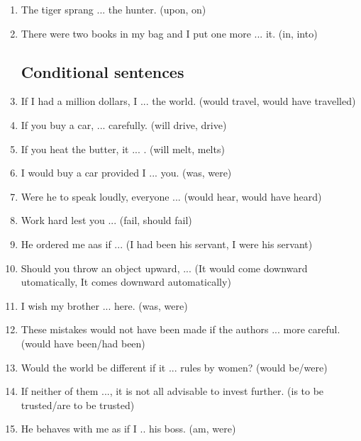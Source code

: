 \documentclass[12pt]{article}
\begin{document}
\begin{enumerate}
    \item The tiger sprang ... the hunter. \hfill (upon, on)

    \item There were two books in my bag and I put one more ... it. \hfill (in, into)

  \subsection{Conditional sentences}
    \item If I had a million dollars, I ... the world. \hfill (would travel, would have travelled)

    \item If you buy a car, ... carefully. \hfill (will drive, drive)

    \item If you heat the butter, it ... . \hfill (will melt, melts)

    \item I would buy a car provided I ... you. (was, were)

    \item Were he to speak loudly, everyone ... \hfill (would hear, would have heard)

    \item Work hard lest you ... \hfill (fail, should fail)

    \item He ordered me aas if ... \hfill (I had been his servant, I were his servant)

    \item Should you throw an object upward, ... \hfill (It would come downward utomatically, It comes downward automatically)

    \item I wish my brother ... here. \hfill (was, were)

    \item These mistakes would not have been made if the authors ... more careful. (would have been/had been)

    \item Would the world be different if it ... rules by women? \hfill (would be/were)

    \item If neither of them ..., it is not all advisable to invest further. \hfill (is to be trusted/are to be trusted)

    \item He behaves with me as if I .. his boss. \hfill (am, were)


\end{enumerate}
\end{document}
